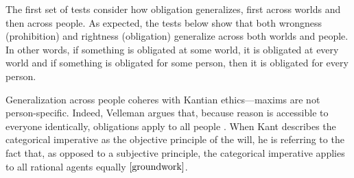\begin{isabellebody}
\begin{isamarkuptext}
The first set of tests consider how obligation generalizes, first across worlds and then across
people. As expected, the tests below show that both wrongness (prohibition) and rightness (obligation)
generalize across both worlds and people. In other words, if something is obligated at some world, it 
is obligated at every world and if something is obligated for some person, then it is obligated for 
every person. 

Generalization across people coheres with Kantian ethics—maxims are not person-specific.
Indeed, Velleman argues that, because reason is accessible to everyone identically, obligations apply 
to all people \cite[25]{velleman}. When Kant describes the categorical imperative as the objective 
principle of the will, he is referring to the fact that, as opposed to a subjective principle, the categorical
imperative applies to all rational agents equally $\cite[16]{groundwork}$. 


\end{isamarkuptext}
\end{isabellebody}
